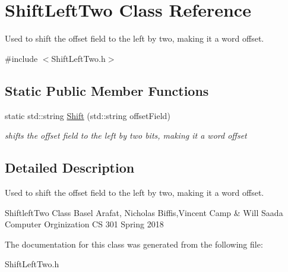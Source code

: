 \hypertarget{class_shift_left_two}{}\section{Shift\+Left\+Two Class Reference}
\label{class_shift_left_two}


Used to shift the offset field to the left by two, making it a word offset.  




{\ttfamily \#include $<$Shift\+Left\+Two.\+h$>$}

\subsection*{Static Public Member Functions}
\begin{DoxyCompactItemize}
\item 
\mbox{\label{class_shift_left_two_ac5c1981353db16983cd30c5acdee3622}} 
static std\+::string \mbox{\hyperlink{class_shift_left_two_ac5c1981353db16983cd30c5acdee3622}{Shift}} (std\+::string offset\+Field)
\begin{DoxyCompactList}\small\item\em shifts the offset field to the left by two bits, making it a word offset \end{DoxyCompactList}\end{DoxyCompactItemize}


\subsection{Detailed Description}
Used to shift the offset field to the left by two, making it a word offset. 

Shiftleft\+Two Class Basel Arafat, Nicholas Biffis,Vincent Camp \& Will Saada Computer Orginization CS 301 Spring 2018 

The documentation for this class was generated from the following file\+:\begin{DoxyCompactItemize}
\item 
Shift\+Left\+Two.\+h\end{DoxyCompactItemize}
